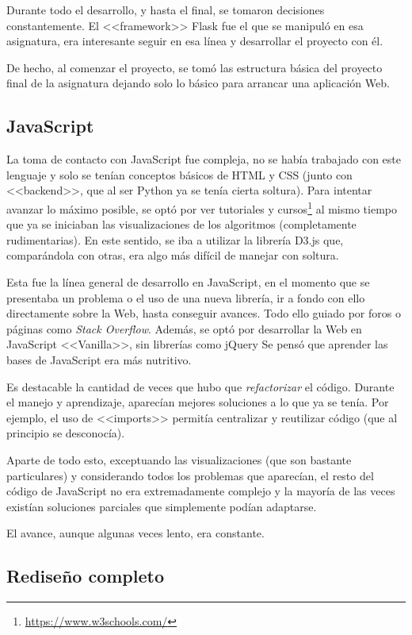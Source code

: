 Durante todo el desarrollo, y hasta el final, se tomaron decisiones
constantemente. El <<framework>> Flask fue el que se manipuló en esa asignatura,
era interesante seguir en esa línea y desarrollar el proyecto con él. 

De hecho, al comenzar el proyecto, se tomó las estructura básica del proyecto
final de la asignatura dejando solo lo básico para arrancar una aplicación Web.

\subsection{JavaScript}
La toma de contacto con JavaScript fue compleja, no se había trabajado con este
lenguaje y solo se tenían conceptos básicos de HTML y CSS (junto con
<<backend>>, que al ser Python ya se tenía cierta soltura). Para intentar
avanzar lo máximo posible, se optó por ver tutoriales y
cursos\footnote{\url{https://www.w3schools.com/}} al mismo tiempo que ya se
iniciaban las visualizaciones de los algoritmos (completamente rudimentarias).
En este sentido, se iba a utilizar la librería D3.js que, comparándola con
otras, era algo más difícil de manejar con soltura.

Esta fue la línea general de desarrollo en JavaScript, en el momento que se
presentaba un problema o el uso de una nueva librería, ir a fondo con ello
directamente sobre la Web, hasta conseguir avances. Todo ello guiado por foros o
páginas como \textit{Stack Overflow}. Además, se optó por desarrollar la Web en
JavaScript <<Vanilla>>, sin librerías como jQuery Se pensó que aprender las
bases de JavaScript era más nutritivo.

Es destacable la cantidad de veces que hubo que \textit{refactorizar} el código.
Durante el manejo y aprendizaje, aparecían mejores soluciones a lo que ya se
tenía. Por ejemplo, el uso de <<imports>> permitía centralizar y reutilizar
código (que al principio se desconocía).

Aparte de todo esto, exceptuando las visualizaciones (que son bastante
particulares) y considerando todos los problemas que aparecían, el resto del
código de JavaScript no era extremadamente complejo y la mayoría de las veces
existían soluciones parciales que simplemente podían adaptarse. 

El avance, aunque algunas veces lento, era constante.

\subsection{Rediseño completo}

